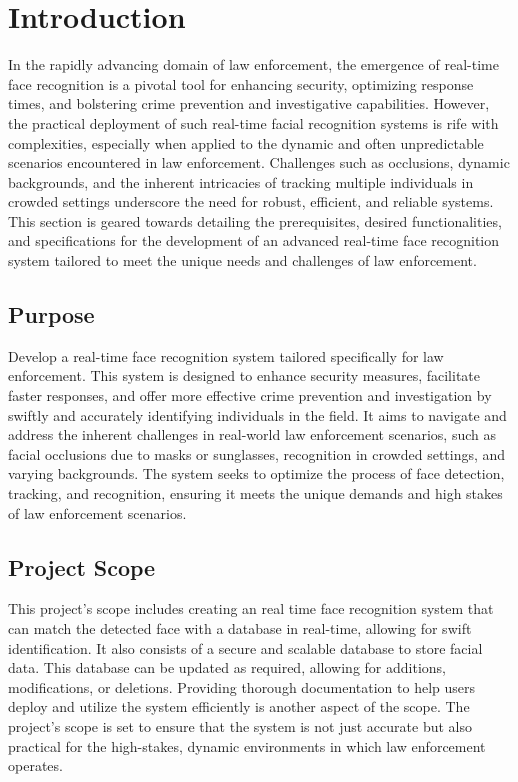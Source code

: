 \section{Introduction}
    In the rapidly advancing domain of law enforcement, the emergence of real-time face recognition is a pivotal tool for enhancing security, optimizing response times, and bolstering crime prevention and investigative capabilities. However, the practical deployment of such real-time facial recognition systems is rife with complexities, especially when applied to the dynamic and often unpredictable scenarios encountered in law enforcement. Challenges such as occlusions, dynamic backgrounds, and the inherent intricacies of tracking multiple individuals in crowded settings underscore the need for robust, efficient, and reliable systems. This section is geared towards detailing the prerequisites, desired functionalities, and specifications for the development of an advanced real-time face recognition system tailored to meet the unique needs and challenges of law enforcement.
    
    \subsection{Purpose}
    Develop a real-time face recognition system tailored specifically for law enforcement. This system is designed to enhance security measures, facilitate faster responses, and offer more effective crime prevention and investigation by swiftly and accurately identifying individuals in the field. It aims to navigate and address the inherent challenges in real-world law enforcement scenarios, such as facial occlusions due to masks or sunglasses, recognition in crowded settings, and varying backgrounds. The system seeks to optimize the process of face detection, tracking, and recognition, ensuring it meets the unique demands and high stakes of law enforcement scenarios.
    
    \subsection{Project Scope}
    This project's scope includes creating an real time face recognition system that can match the detected face with a database in real-time, allowing for swift identification. It also consists of a secure and scalable database to store facial data. This database can be updated as required, allowing for additions, modifications, or deletions.    Providing thorough documentation to help users deploy and utilize the system efficiently is another aspect of the scope. The project's scope is set to ensure that the system is not just accurate but also practical for the high-stakes, dynamic environments in which law enforcement operates.


